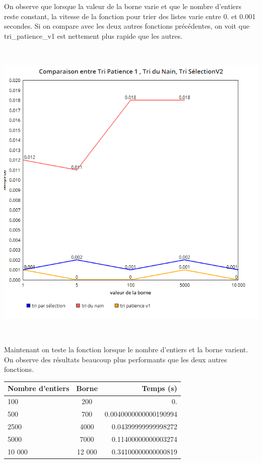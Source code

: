 \documentclass[a4paper, 12pt]{article}
\begin{document}
On observe que lorsque la valeur de la borne varie et que le nombre d'entiers reste constant, la vitesse de la fonction pour trier des listes varie entre 0. et 0.001 secondes. Si on compare avec les deux autres fonctions précédentes, on voit que tri\_patience\_v1 est nettement plus rapide que les autres. 

~


\begin{center}
\includegraphics[scale=0.25]{tri_patience1_comparaisonB.png}
\end{center}
~

Maintenant on teste la fonction lorsque le nombre d'entiers et la borne varient. On observe des résultats beaucoup plus performants que les deux autres fonctions.
~

\begin{table}[htbp]
  \centering
  \begin{tabular}{||l|c|r||}\hline
    \textbf{Nombre d'entiers} & \textbf{Borne} & \textbf{Temps (s)}\\\hline\hline
    100                     &    200                  &   0.           \\\hline
    500                 & 700               & 0.0040000000000190994 \\\hline
    2500                 & 4000             & 0.04399999999998272    \\\hline
    5000                & 7000             & 0.11400000000003274  \\\hline
    10 000                 & 12 000         & 0.34100000000000819 \\\hline
  \end{tabular}
  \label{tablepat1}
\end{table}
\end{document}
